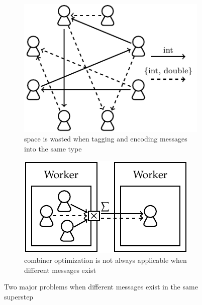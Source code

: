 \documentclass{sokendai_thesis} %
\begin{document}
\begin{figure}[th]
\centering
\begin{subfigure}[b]{0.45\textwidth}
 \includegraphics[width=\textwidth]{figures/multi-msg.pdf}
 \caption{space is wasted when tagging and encoding messages into the same type}
 \label{fig:multi-msg}
\end{subfigure}
\hspace{5pt}
\begin{subfigure}[b]{0.45\textwidth}
 \includegraphics[width=\textwidth]{figures/comb-err.pdf}
 \caption{combiner optimization is not always applicable when different messages exist}
 \label{fig:comb-err}
\end{subfigure}
\caption{Two major problems when different messages exist in the same superstep}
\label{fig:multi-msg-example}
\end{figure}
\end{document}
